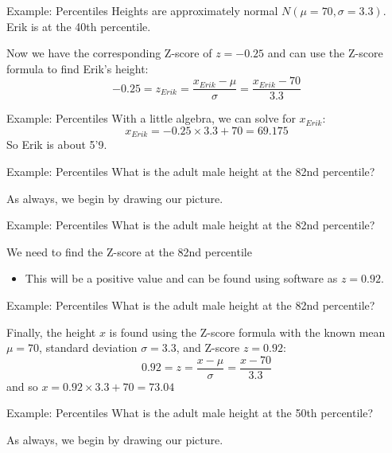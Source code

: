\begin{frame}{Example: Percentiles}
    Heights are approximately normal $N(\mu=70, \sigma=3.3)$. Erik is at the 40th percentile.
    
    \vspace{12pt}Now we have the corresponding Z-score of $z=-0.25$ and can use the Z-score formula to find Erik's height:
    \[
    -0.25 = z_{Erik} = \frac{x_{Erik}-\mu}{\sigma} = \frac{x_{Erik}-70}{3.3}
    \]
\end{frame}

\begin{frame}{Example: Percentiles}
    With a little algebra, we can solve for $x_{Erik}$:
    \[
    x_{Erik}=-0.25\times3.3 + 70=69.175
    \]
    So Erik is about 5'9.
\end{frame}

\begin{frame}{Example: Percentiles}
    What is the adult male height at the 82nd percentile?
    
    \vspace{12pt}As always, we begin by drawing our picture.
\end{frame}

\begin{frame}{Example: Percentiles}
    What is the adult male height at the 82nd percentile?
    
    \vspace{12pt}We need to find the Z-score at the 82nd percentile
    \begin{itemize}
        \item This will be a positive value and can be found using software as $z = 0.92$. 
    \end{itemize}
\end{frame}

\begin{frame}{Example: Percentiles}
    What is the adult male height at the 82nd percentile?
    
    \vspace{12pt}
    Finally, the height $x$ is found using the Z-score formula with the known mean $\mu=70$, standard deviation $\sigma=3.3$, and Z-score $z = 0.92$:
    \[
        0.92 = z = \frac{x-\mu}{\sigma} = \frac{x-70}{3.3}
    \]
    and so $x=0.92\times3.3 + 70=73.04$
\end{frame}

\begin{frame}{Example: Percentiles}
    What is the adult male height at the 50th percentile?
    
    \vspace{12pt}As always, we begin by drawing our picture.
\end{frame}

